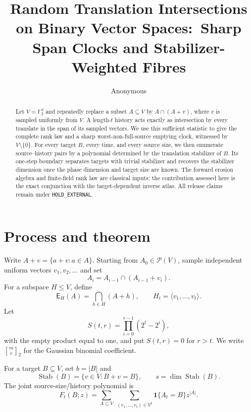 \documentclass[a4paper,10pt]{amsart}
\title[Random Translation Intersections]{Random Translation Intersections on Binary Vector Spaces:\
Sharp Span Clocks and Stabilizer-Weighted Fibres}
\author{Anonymous}
\date{}
\newcommand{\F}{\mathbb F}
\newcommand{\cP}{\mathcal P}
\newcommand{\E}{\mathsf E}
\newcommand{\Stab}{\operatorname{Stab}}
\begin{document}
\begin{abstract}
Let $V=\F_2^d$ and repeatedly replace a subset $A\subseteq V$ by
$A\cap(A+v)$, where $v$ is sampled uniformly from $V$.  A length-$t$
history acts exactly as intersection by every translate in the span of its
sampled vectors.  We use this sufficient statistic to give the complete rank
law and a sharp worst-non-full-source emptying clock, witnessed by $V\setminus
\{0\}$.  For every target $B$, every time, and every source size, we then
enumerate source--history pairs by a polynomial determined by the translation
stabilizer of $B$.  Its one-step boundary separates targets with trivial
stabilizer and recovers the stabilizer dimension once the phase dimension and
target size are known.  The forward erosion algebra and finite-field rank law
are classical inputs; the contribution assessed here is the exact conjunction
with the target-dependent inverse atlas.  All release claims remain under
\texttt{HOLD\_EXTERNAL}.
\end{abstract}

\maketitle

\section{Process and theorem}

Write $A+v=\{a+v:a\in A\}$.  Starting from $A_0\in\cP(V)$, sample independent
uniform vectors $v_1,v_2,\ldots$ and set
\begin{equation}\label{eq:update}
 A_i=A_{i-1}\cap(A_{i-1}+v_i).
\end{equation}
For a subspace $H\leq V$, define
\[
 \E_H(A)=\bigcap_{h\in H}(A+h),
 \qquad H_t=\langle v_1,\ldots,v_t\rangle.
\]
Let
\begin{equation}\label{eq:S}
 S(t,r)=\prod_{i=0}^{r-1}(2^t-2^i),
\end{equation}
with the empty product equal to one, and put $S(t,r)=0$ for $r>t$.  We write
$\genfrac{[}{]}{0pt}{}{m}{r}_2$ for the Gaussian binomial coefficient.

For a target $B\subseteq V$, set $b=|B|$ and
\[
 \Stab(B)=\{v\in V:B+v=B\},\qquad s=\dim\Stab(B).
\]
The joint source-size/history polynomial is
\begin{equation}\label{eq:Fdef}
 F_t(B;z)=\sum_{A\subseteq V}\ \sum_{(v_1,\ldots,v_t)\in V^t}
 \mathbf 1\{A_t=B\}z^{|A|}.
\end{equation}
\end{document}

